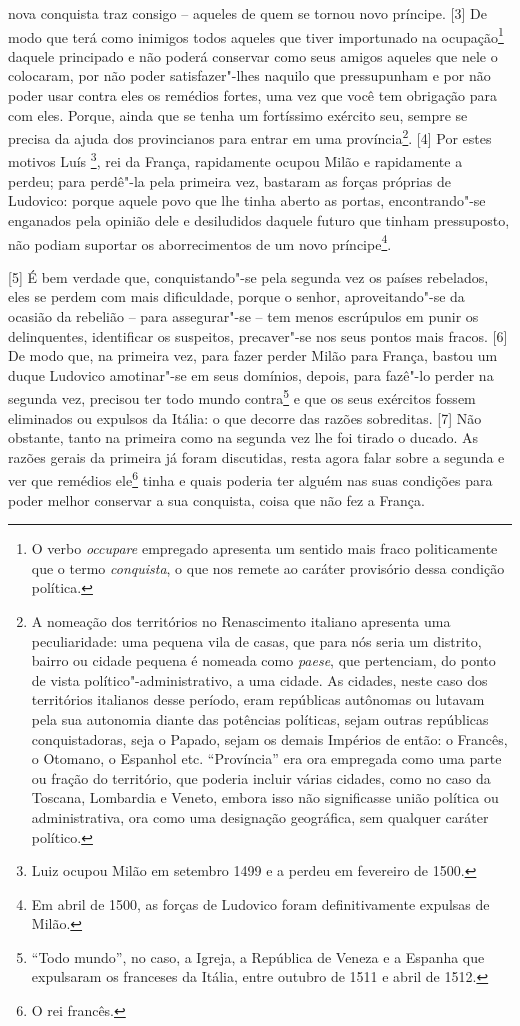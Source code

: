 nova conquista traz consigo -- aqueles de quem se tornou novo príncipe.
{[}3{]} De modo que terá como inimigos todos aqueles que tiver
importunado na ocupação\footnote{O verbo \emph{occupare} empregado
  apresenta um sentido mais fraco politicamente que o termo
  \emph{conquista}, o que nos remete ao caráter provisório dessa
  condição política.} daquele principado e não poderá conservar como
seus amigos aqueles que nele o colocaram, por não poder satisfazer"-lhes
naquilo que pressupunham e por não poder usar contra eles os remédios
fortes, uma vez que você tem obrigação para com eles. Porque, ainda que
se tenha um fortíssimo exército seu, sempre se precisa da ajuda dos
provincianos para entrar em uma província\footnote{A nomeação dos
  territórios no Renascimento italiano apresenta uma peculiaridade: uma
  pequena vila de casas, que para nós seria um distrito, bairro ou
  cidade pequena é nomeada como \emph{paese}, que pertenciam, do ponto
  de vista político"-administrativo, a uma cidade. As cidades, neste caso
  dos territórios italianos desse período, eram repúblicas autônomas ou
  lutavam pela sua autonomia diante das potências políticas, sejam
  outras repúblicas conquistadoras, seja o Papado, sejam os demais
  Impérios de então: o Francês, o Otomano, o Espanhol etc. ``Província''
  era ora empregada como uma parte ou fração do território, que poderia
  incluir várias cidades, como no caso da Toscana, Lombardia e Veneto,
  embora isso não significasse união política ou administrativa, ora
  como uma designação geográfica, sem qualquer caráter político.}.
{[}4{]} Por estes motivos Luís \footnote{Luiz  ocupou Milão em
  setembro 1499 e a perdeu em fevereiro de 1500.}, rei da França,
rapidamente ocupou Milão e rapidamente a perdeu; para perdê"-la pela
primeira vez, bastaram as forças próprias de Ludovico: porque aquele
povo que lhe tinha aberto as portas, encontrando"-se enganados pela
opinião dele e desiludidos daquele futuro que tinham pressuposto, não
podiam suportar os aborrecimentos de um novo príncipe\footnote{Em abril
  de 1500, as forças de Ludovico foram definitivamente expulsas de
  Milão.}.

{[}5{]} É bem verdade que, conquistando"-se pela segunda vez os países
rebelados, eles se perdem com mais dificuldade, porque o senhor,
aproveitando"-se da ocasião da rebelião -- para assegurar"-se -- tem menos
escrúpulos em punir os delinquentes, identificar os suspeitos,
precaver"-se nos seus pontos mais fracos. {[}6{]} De modo que, na
primeira vez, para fazer perder Milão para França, bastou um duque
Ludovico amotinar"-se em seus domínios, depois, para fazê"-lo perder na
segunda vez, precisou ter todo mundo contra\footnote{``Todo mundo'', no
  caso, a Igreja, a República de Veneza e a Espanha que expulsaram os
  franceses da Itália, entre outubro de 1511 e abril de 1512.} e que os
seus exércitos fossem eliminados ou expulsos da Itália: o que decorre
das razões sobreditas. {[}7{]} Não obstante, tanto na primeira como na
segunda vez lhe foi tirado o ducado. As razões gerais da primeira já
foram discutidas, resta agora falar sobre a segunda e ver que remédios
ele\footnote{O rei francês.} tinha e quais poderia ter alguém nas suas
condições para poder melhor conservar a sua conquista, coisa que não fez
a França.


